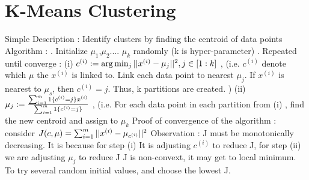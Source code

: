 \documentclass{article}
\begin{document}
\section{K-Means Clustering}
Simple Description : Identify clusters by finding the centroid of data points
\newline
\newline
Algorithm :  
\newline
{}. Initialize \( \mu_1 \),\( \mu_2 \).... \( \mu_k \) randomly (k is hyper-parameter) 
\newline
{}. Repeated until converge : 
\newline
\newline
(i) \( $$c^{(i)} := \arg \min_j ||x^{(i)} - \mu_j||^2$$ , j \in [1:k]\) , (i.e. \(c^{(i)}\) denote which  \( \mu \)  the \(x^{(i)}\) is linked to. Link each data point to nearest  \( \mu_j \). If \( x^{(i)}\) is nearest to \( \mu_s \), then \(c^{(i)} = j\). Thus, k partitions are created.  )
\newline
\newline
(ii) \($$\mu_j := \frac{\sum_{i=1}^m 1\{{c^{(i)} = j}\} x^{(i)}}{\sum_{i=1}^m 1\{{c^{(i)} = j}\}}$$\) , (i.e. For each data point in each partition from (i) , find the new centroid and assign to \(\mu_k\)
\newline
\newline 
Proof of convergence of the algorithm : consider 
\newline 
\newline 
\( $$J(c, \mu) = \sum_{i=1}^m ||x^{(i)} - \mu_{c^{(i)}}||^2$$\)
\newline 
Observation : J must be monotonically decreasing. It is because for step (i) It is adjusting \(c^(i)\) to reduce J, for step (ii) we are adjusting  \(\mu_j\) to reduce J
\newline 
J is non-convext, it may get to local minimum. To try several random initial values, and choose the lowest J.
\end{document}
